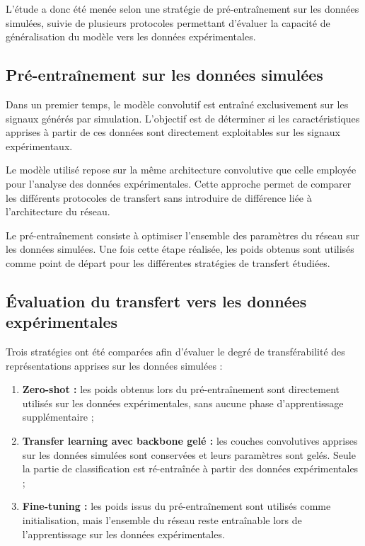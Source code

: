 \documentclass[12pt,a4paper,twoside]{article}
\begin{document}
L'étude a donc été menée selon une stratégie de pré-entraînement sur les données simulées, suivie de plusieurs protocoles permettant d'évaluer la capacité de généralisation du modèle vers les données expérimentales.

\subsection{Pré-entraînement sur les données simulées}
\label{subsec:pretrain_simul}

Dans un premier temps, le modèle convolutif est entraîné exclusivement sur les signaux générés par simulation. L'objectif est de déterminer si les caractéristiques apprises à partir de ces données sont directement exploitables sur les signaux expérimentaux.

Le modèle utilisé repose sur la même architecture convolutive que celle employée pour l'analyse des données expérimentales. Cette approche permet de comparer les différents protocoles de transfert sans introduire de différence liée à l'architecture du réseau.

Le pré-entraînement consiste à optimiser l'ensemble des paramètres du réseau sur les données simulées. Une fois cette étape réalisée, les poids obtenus sont utilisés comme point de départ pour les différentes stratégies de transfert étudiées.

\subsection{Évaluation du transfert vers les données expérimentales}
\label{subsec:eval_transfert}

Trois stratégies ont été comparées afin d'évaluer le degré de transférabilité des représentations apprises sur les données simulées :

\begin{enumerate}
\item \textbf{Zero-shot :} les poids obtenus lors du pré-entraînement sont directement utilisés sur les données expérimentales, sans aucune phase d'apprentissage supplémentaire ;

\item \textbf{Transfer learning avec backbone gelé :} les couches convolutives apprises sur les données simulées sont conservées et leurs paramètres sont gelés. Seule la partie de classification est ré-entraînée à partir des données expérimentales ;

\item \textbf{Fine-tuning :} les poids issus du pré-entraînement sont utilisés comme initialisation, mais l'ensemble du réseau reste entraînable lors de l'apprentissage sur les données expérimentales.

\end{enumerate}
\end{document}
